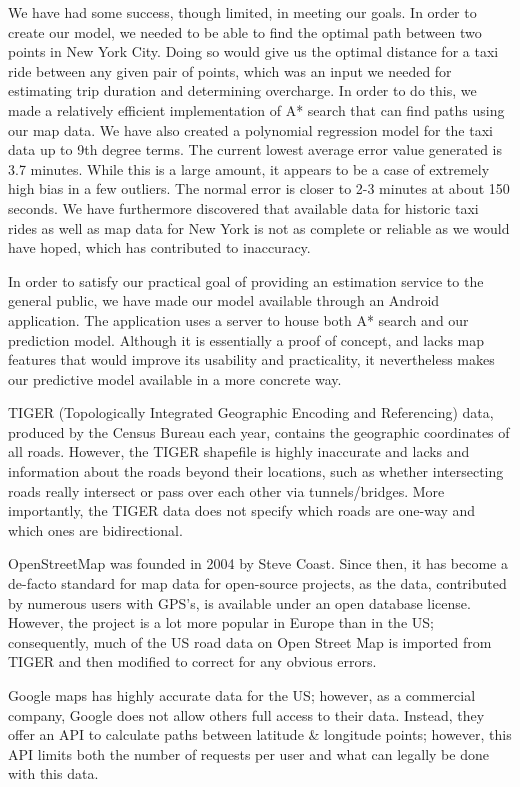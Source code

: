 \documentclass{sig-alternate}
\begin{document}
We have had some success, though limited, in meeting our goals.  In order to create our model, we needed to be able to find the optimal path between two points in New York City.  Doing so would give us the optimal distance for a taxi ride between any given pair of points, which was an input we needed for estimating trip duration and determining overcharge.  In order to do this, we made a relatively efficient implementation of A* search that can find paths using our map data.  We have also created a polynomial regression model for the taxi data up to 9th degree terms.  The current lowest average error value generated is 3.7 minutes. While this is a large amount, it appears to be a case of extremely high bias in a few outliers. The normal error is closer to 2-3 minutes at about 150 seconds.  We have furthermore discovered that available data for historic taxi rides as well as map data for New York is not as complete or reliable as we would have hoped, which has contributed to inaccuracy.

In order to satisfy our practical goal of providing an estimation service to the general public, we have made our model available through an Android application.  The application uses a server to house both A* search and our prediction model.  Although it is essentially a proof of concept, and lacks map features that would improve its usability and practicality, it nevertheless makes our predictive model available in a more concrete way. 

TIGER (Topologically Integrated Geographic Encoding and Referencing) data, produced by the Census Bureau each year, contains the geographic coordinates of all roads. However, the TIGER shapefile is highly inaccurate and lacks and information about the roads beyond their locations, such as whether intersecting roads really intersect or pass over each other via tunnels/bridges. More importantly, the TIGER data does not specify which roads are one-way and which ones are bidirectional.

OpenStreetMap was founded in 2004 by Steve Coast\cite{osm}. Since then, it has become a de-facto standard for map data for open-source projects, as the data, contributed by numerous users with GPS's, is available under an open database license. However, the project is a lot more popular in Europe than in the US; consequently, much of the US road data on Open Street Map is imported from TIGER and then modified to correct for any obvious errors.

Google maps has highly accurate data for the US; however, as a commercial company, Google does not allow others full access to their data. Instead, they offer an API to calculate paths between latitude & longitude points; however, this API limits both the number of requests per user and what can legally be done with this data.
\end{document}

